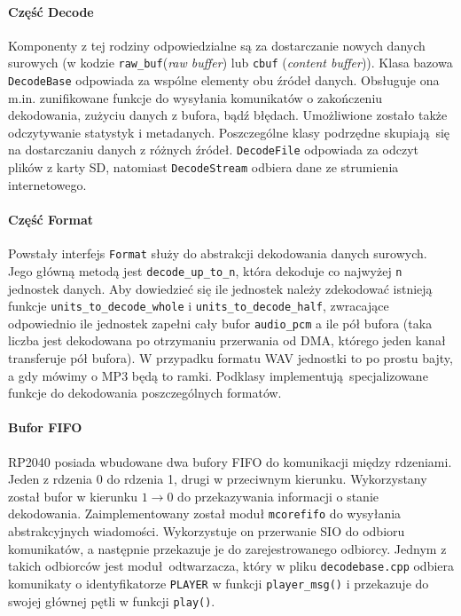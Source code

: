 \documentclass[12pt]{report}
\begin{document}
	\paragraph{Część Decode}
	Komponenty z tej rodziny odpowiedzialne są za dostarczanie nowych danych surowych (w kodzie \lstinline|raw_buf|(\textit{raw buffer}) lub \lstinline|cbuf| (\textit{content buffer})). Klasa bazowa \lstinline|DecodeBase| odpowiada za wspólne elementy obu źródeł danych. Obsługuje ona m.in. zunifikowane funkcje do wysyłania komunikatów o zakończeniu dekodowania, zużyciu danych z bufora, bądź błędach. Umożliwione zostało także odczytywanie statystyk i metadanych. Poszczególne klasy podrzędne skupiają się na dostarczaniu danych z różnych źródeł. \lstinline|DecodeFile| odpowiada za odczyt plików z karty SD, natomiast \lstinline|DecodeStream| odbiera dane ze strumienia internetowego.
	
	\paragraph{Część Format}
	Powstały interfejs \lstinline|Format| służy do abstrakcji dekodowania danych surowych. Jego główną metodą jest \lstinline|decode_up_to_n|, która dekoduje co najwyżej \lstinline|n| jednostek danych. Aby dowiedzieć się ile jednostek należy zdekodować istnieją funkcje \lstinline|units_to_decode_whole| i \lstinline|units_to_decode_half|, zwracające odpowiednio ile jednostek zapełni cały bufor \lstinline|audio_pcm| a ile pół bufora (taka liczba jest dekodowana po otrzymaniu przerwania od DMA, którego jeden kanał transferuje pół bufora). W przypadku formatu WAV jednostki to po prostu bajty, a gdy mówimy o MP3 będą to ramki. Podklasy implementują specjalizowane funkcje do dekodowania poszczególnych formatów.
	
	\paragraph{Bufor FIFO}
	RP2040 posiada wbudowane dwa bufory FIFO do komunikacji między rdzeniami. Jeden z rdzenia 0 do rdzenia 1, drugi w przeciwnym kierunku. Wykorzystany został bufor w kierunku $1 \rightarrow 0$ do przekazywania informacji o stanie dekodowania. Zaimplementowany został moduł \lstinline|mcorefifo| do wysyłania abstrakcyjnych wiadomości. Wykorzystuje on przerwanie SIO do odbioru komunikatów, a następnie przekazuje je do zarejestrowanego odbiorcy. Jednym z takich odbiorców jest moduł odtwarzacza, który w pliku \lstinline|decodebase.cpp| odbiera komunikaty o identyfikatorze \lstinline|PLAYER| w funkcji \lstinline|player_msg()| i przekazuje do swojej głównej pętli w funkcji \lstinline|play()|.
	
\end{document}
